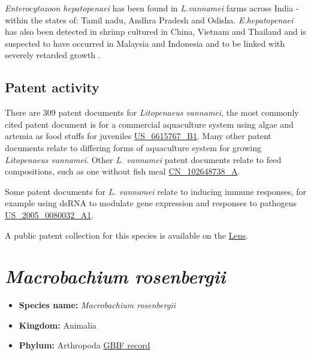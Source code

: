 \documentclass[]{book}
\providecommand{\tightlist}{%
  \setlength{\itemsep}{0pt}\setlength{\parskip}{0pt}}
\theoremstyle{definition}
\theoremstyle{definition}
\theoremstyle{definition}
\theoremstyle{remark}
\begin{document}
\emph{Enterocytozoon hepatopenaei} has been found in \emph{L.vannamei}
farms across India - within the states of: Tamil nadu, Andhra Pradesh
and Odisha. \emph{E.hepatopenaei} has also been detected in shrimp
cultured in China, Vietnam and Thailand and is suspected to have
occurred in Malaysia and Indonesia and to be linked with severely
retarded growth \citep{Biju_2016}.

\hypertarget{patent-activity-2}{%
\subsection{Patent activity}\label{patent-activity-2}}

There are 309 patent documents for \emph{Litopenaeus vannamei}, the most
commonly cited patent document is for a commercial aquaculture system
using algae and artemia as food stuffs for juveniles
\href{https://www.lens.org/lens/patent/US_6615767_B1}{US\_6615767\_B1}.
Many other patent documents relate to differing forms of aquaculture
system for growing \emph{Litopenaeus vannamei}. Other \emph{L. vannamei}
patent documents relate to feed compositions, such as one without fish
meal
\href{https://www.lens.org/lens/patent/CN_102648738_A}{CN\_102648738\_A}.

Some patent documents for \emph{L. vannamei} relate to inducing immune
responses, for example using dsRNA to modulate gene expression and
responses to pathogens
\href{https://www.lens.org/lens/patent/US_2005_0080032_A1}{US\_2005\_0080032\_A1}.

A public patent collection for this species is available on the
\href{https://www.lens.org/lens/collection/24984}{Lens}.

\hypertarget{macrobachium-rosenbergii}{%
\section{\texorpdfstring{\emph{Macrobachium
rosenbergii}}{Macrobachium rosenbergii}}\label{macrobachium-rosenbergii}}

\begin{itemize}
\tightlist
\item
  \textbf{Species name:} \emph{Macrobachium rosenbergii}\\
\item
  \textbf{Kingdom:} Animalia\\
\item
  \textbf{Phylum:} Arthropoda
  \href{https://www.gbif.org/species/2224546}{GBIF record}
\end{itemize}
\end{document}
